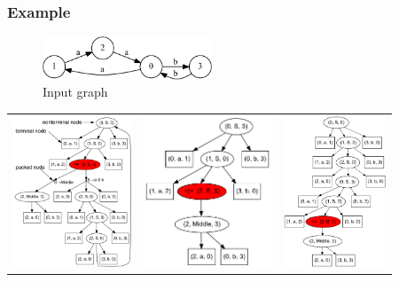 \documentclass{beamer}
\begin{document}
\begin{frame}
  \transwipe[direction=90]
  \frametitle{Example}
\begin{figure}[ht]
    \centering
        \includegraphics[width=0.45\textwidth]{pictures/input.pdf} \\
        Input graph
\end{figure}

\begin{overprint}

\begin{tabular}{  c  c  c  }
    \includegraphics[height=4.5cm]{pictures/AnBn.pdf}
    &
    \includegraphics[height=4.5cm]{pictures/AnBn_2.pdf}

    &
    \includegraphics[height=4.5cm]{pictures/AnBn_1.pdf}


\end{tabular}
\end{overprint}
\end{frame}
\end{document}
